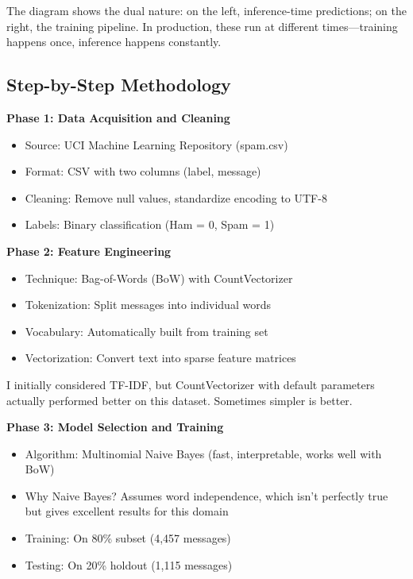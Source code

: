 \documentclass[12pt, a4paper]{article}
\begin{document}
\begin{devnote}
    The diagram shows the dual nature: on the left, inference-time predictions; on the right, the training pipeline. In production, these run at different times---training happens once, inference happens constantly.
\end{devnote}

\subsection{Step-by-Step Methodology}

\textbf{Phase 1: Data Acquisition and Cleaning}

\begin{itemize}
    \item Source: UCI Machine Learning Repository (spam.csv)
    \item Format: CSV with two columns (label, message)
    \item Cleaning: Remove null values, standardize encoding to UTF-8
    \item Labels: Binary classification (Ham = 0, Spam = 1)
\end{itemize}

\textbf{Phase 2: Feature Engineering}

\begin{itemize}
    \item Technique: Bag-of-Words (BoW) with CountVectorizer
    \item Tokenization: Split messages into individual words
    \item Vocabulary: Automatically built from training set
    \item Vectorization: Convert text into sparse feature matrices
\end{itemize}

\begin{devnote}
    I initially considered TF-IDF, but CountVectorizer with default parameters actually performed better on this dataset. Sometimes simpler is better.
\end{devnote}

\textbf{Phase 3: Model Selection and Training}

\begin{itemize}
    \item Algorithm: Multinomial Naive Bayes (fast, interpretable, works well with BoW)
    \item Why Naive Bayes? Assumes word independence, which isn't perfectly true but gives excellent results for this domain
    \item Training: On 80\% subset (4,457 messages)
    \item Testing: On 20\% holdout (1,115 messages)
\end{itemize}
\end{document}
